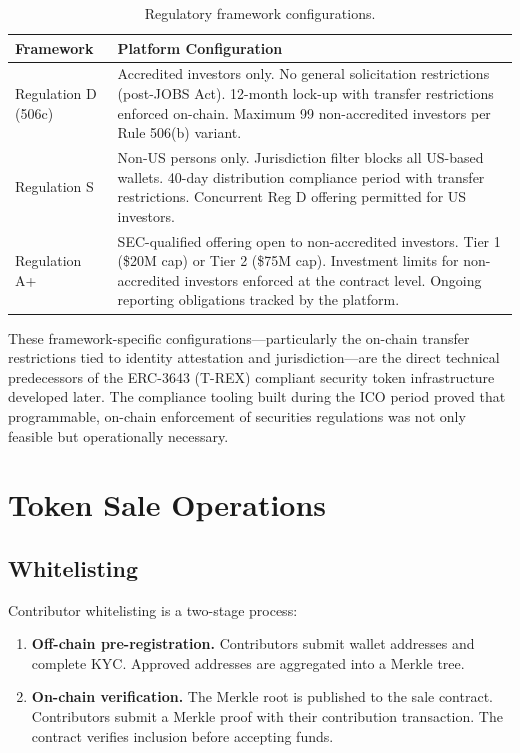 \documentclass[11pt,letterpaper]{article}
\begin{document}
\begin{table}[H]
\centering
\small
\begin{tabular}{lp{8.5cm}}
\toprule
\textbf{Framework} & \textbf{Platform Configuration} \\
\midrule
Regulation D (506c) & Accredited investors only. No general solicitation
    restrictions (post-JOBS Act). 12-month lock-up with transfer restrictions
    enforced on-chain. Maximum 99 non-accredited investors per Rule 506(b)
    variant. \\
Regulation S & Non-US persons only. Jurisdiction filter blocks all US-based
    wallets. 40-day distribution compliance period with transfer restrictions.
    Concurrent Reg D offering permitted for US investors. \\
Regulation A+ & SEC-qualified offering open to non-accredited investors.
    Tier 1 (\$20M cap) or Tier 2 (\$75M cap). Investment limits for
    non-accredited investors enforced at the contract level. Ongoing
    reporting obligations tracked by the platform. \\
\bottomrule
\end{tabular}
\caption{Regulatory framework configurations.}
\label{tab:frameworks}
\end{table}

These framework-specific configurations---particularly the on-chain transfer
restrictions tied to identity attestation and jurisdiction---are the direct
technical predecessors of the ERC-3643 (T-REX) compliant security token
infrastructure developed later. The compliance tooling built during the ICO
period proved that programmable, on-chain enforcement of securities regulations
was not only feasible but operationally necessary.

\section{Token Sale Operations}
\label{sec:operations}

\subsection{Whitelisting}

Contributor whitelisting is a two-stage process:

\begin{enumerate}[leftmargin=1.2em]
    \item \textbf{Off-chain pre-registration.} Contributors submit wallet
    addresses and complete KYC. Approved addresses are aggregated into a
    Merkle tree.
    \item \textbf{On-chain verification.} The Merkle root is published to the
    sale contract. Contributors submit a Merkle proof with their contribution
    transaction. The contract verifies inclusion before accepting funds.
\end{enumerate}
\end{document}
